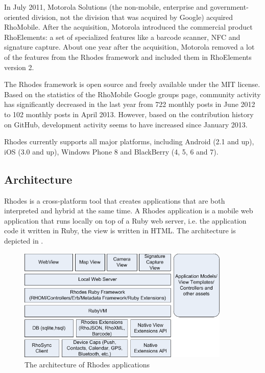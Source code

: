 In July 2011, Motorola Solutions (the non-mobile, enterprise and government-oriented division, not the division that was acquired by Google) acquired RhoMobile. After the acquisition, Motorola introduced the commercial product RhoElements: a set of specialized features like a barcode scanner, NFC and signature capture. About one year after the acquisition, Motorola removed a lot of the features from the Rhodes framework and included them in RhoElements version 2.

The Rhodes framework is open source and freely available under the MIT license. Based on the statistics of the RhoMobile Google groups page,  community activity has significantly decreased in the last year from 722 monthly posts in June 2012 to 102 monthly posts in April 2013. However, based on the contribution history on GitHub, development activity seems to have increased since January 2013.

Rhodes currently supports all major platforms, including Android (2.1 and up), iOS (3.0 and up), Windows Phone 8 and BlackBerry (4, 5, 6 and 7).

\subsection{Architecture}

Rhodes is a cross-platform tool that creates applications that are both interpreted and hybrid at the same time. A Rhodes application is a mobile web application that runs locally on top of a Ruby web server, i.e. the application code it written in Ruby, the view is written in HTML. The architecture is depicted in .

\begin{figure}[h]
    \begin{center}
        \includegraphics[width=0.9\textwidth]{../resources/figs/rhodes-architecture.png}
        \caption{The architecture of Rhodes applications \cite{Rhodes:Overview}}
        \label{fig:rhodes-architecture}
    \end{center}
\end{figure}

